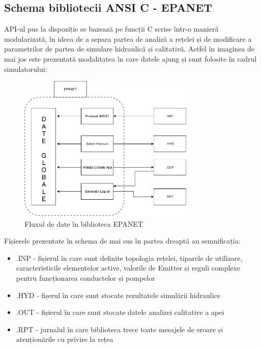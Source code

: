 \subsection{Schema bibliotecii ANSI C - EPANET}

API-ul pus la dispoziție se bazează pe funcții C scrise  într-o manieră modularizată, în ideea de a separa partea de analiză a rețelei și de modificare a parametrilor de partea de simulare hidraulică și calitativă. Astfel în imaginea de mai jos este prezentată modalitatea în care datele ajung și sunt folosite în cadrul simulatorului:

\begin{figure}[H]
\centering
\includegraphics[width=0.75\textwidth]{pics/c2_pics/epanet_dataflow.pdf}
\caption{Fluxul de date în biblioteca EPANET \cite{rossman1999epanet}}
\label{fig:EPANET_dataflow}
\end{figure}

\begin{flushleft}
Fișierele prezentate în schema de mai sus în partea dreaptă au semnificația:
\end{flushleft}
\begin{itemize}
    \item .INP - fișierul în care sunt definite topologia rețelei, tiparele de utilizare, caracteristicile elementelor active, valorile de Emitter și reguli complexe pentru funcționarea conductelor și pompelor
    \item .HYD - fișerul în care sunt stocate rezultatele simulării hidraulice
    \item .OUT - fișierul în care sunt stocate datele analizei calitative a apei
    \item .RPT - jurnalul în care biblioteca trece toate mesajele de eroare și atenționările cu privire la rețea
\end{itemize}

